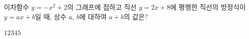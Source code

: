 이차함수 $y=-x^2+2$의 그래프에 접하고 직선 $y=2x+8$에 평행한 직선의 방정식이 $y=ax+b$일 때, 상수 $a$, $b$에 대하여 $a+b$의 값은?
\begin{choices32}{$1$}{$2$}{$3$}{$4$}{$5$}\end{choices32}
